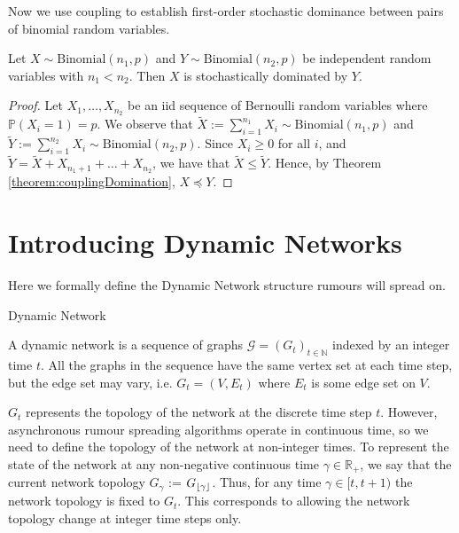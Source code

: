 Now we use coupling to establish first-order stochastic dominance between pairs of binomial random variables.

\begin{theorem}
	Let $X \sim \text{Binomial}(n_1, p)$ and $Y \sim \text{Binomial}(n_2, p)$ be independent random variables with $n_1 < n_2$. Then $X$ is stochastically dominated by $Y$.
\end{theorem}

\begin{proof}
	Let $X_1, \dots, X_{n_2}$ be an iid sequence of Bernoulli random variables where $\mathbb{P}(X_i = 1) = p$. We observe that $\tilde{X} := \sum_{i=1}^{n_1} X_i \sim \text{Binomial}(n_1, p)$ and $\tilde{Y} := \sum_{i=1}^{n_2} X_i \sim \text{Binomial}(n_2, p)$. Since $X_i \geq 0$ for all $i$, and $\tilde{Y} = \tilde{X} + X_{n_1 + 1} + \dots + X_{n_2}$, we have that $\tilde{X} \leq \tilde{Y}$. Hence, by Theorem \ref{theorem:couplingDomination}, $X \preceq Y$.
\end{proof}

\section{Introducing Dynamic Networks}

Here we formally define the Dynamic Network structure rumours will spread on.

\begin{definition}
	Dynamic Network

	\noindent
	A dynamic network is a sequence of graphs $\mathcal{G} = (G_t)_{t \in \mathbb{N}}$ indexed by an integer time $t$. All the graphs in the sequence have the same vertex set at each time step, but the edge set may vary, i.e.  $G_t = (V, E_t)$ where $E_t$ is some edge set on $V$.
\end{definition}

$G_t$ represents the topology of the network at the discrete time step $t$. However, asynchronous rumour spreading algorithms operate in continuous time, so we need to define the topology of the network at non-integer times. To represent the state of the network at any non-negative continuous time $\gamma \in \mathbb{R}_+$, we say that the current network topology $G_\gamma$ := $G_{\lfloor\gamma\rfloor}$. Thus, for any time $\gamma \in [t, t + 1)$ the network topology is fixed to $G_t$. This corresponds to allowing the network topology change at integer time steps only.

